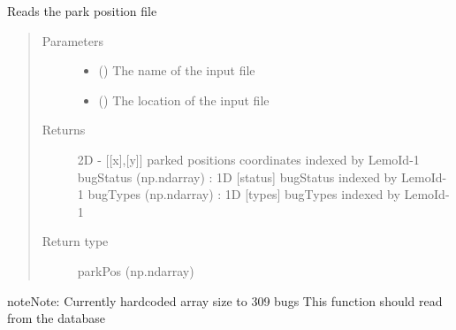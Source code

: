 \documentclass[letterpaper,10pt,english]{sphinxmanual}
\begin{document}

\begin{fulllineitems}
\label{\detokenize{reference:taipanPyRouter.loadParkPosJSON}}
Reads the park position file
\begin{quote}\begin{description}
\item[{Parameters}] \leavevmode\begin{itemize}
\item {} 
 () \textendash{} The name of the input file

\item {} 
 () \textendash{} The location of the input file

\end{itemize}

\item[{Returns}] \leavevmode
2D - {[}{[}x{]},{[}y{]}{]} parked positions coordinates indexed by LemoId-1
bugStatus (np.ndarray) : 1D {[}status{]} bugStatus indexed by LemoId-1
bugTypes (np.ndarray) : 1D {[}types{]} bugTypes indexed by LemoId-1

\item[{Return type}] \leavevmode
parkPos (np.ndarray)

\end{description}\end{quote}

\begin{sphinxadmonition}{note}{Note:}
Currently hardcoded array size to 309 bugs
This function should read from the database
\end{sphinxadmonition}

\end{fulllineitems}

\end{document}
